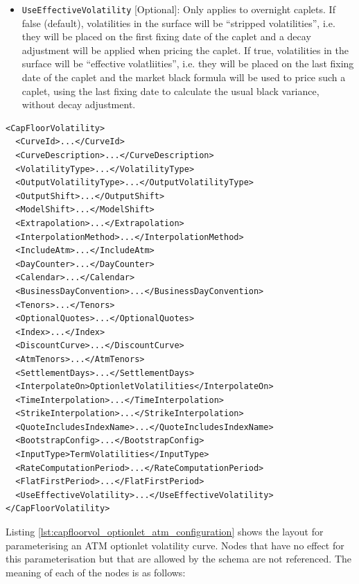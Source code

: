 \begin{itemize}
\item \lstinline!UseEffectiveVolatility! [Optional]:
Only applies to overnight caplets. If false (default), volatilities in the surface will be ``stripped volatilities'',
i.e. they will be placed on the first fixing date of the caplet and a decay adjustment will be applied when pricing the
caplet. If true, volatilities in the surface will be ``effective volatliities'', i.e. they will be placed on the last
fixing date of the caplet and the market black formula will be used to price such a caplet, using the last fixing date
to calculate the usual black variance, without decay adjustment.

\end{itemize}

\begin{longlisting}
\begin{verbatim}
<CapFloorVolatility>
  <CurveId>...</CurveId>
  <CurveDescription>...</CurveDescription>
  <VolatilityType>...</VolatilityType>
  <OutputVolatilityType>...</OutputVolatilityType>
  <OutputShift>...</OutputShift>
  <ModelShift>...</ModelShift>
  <Extrapolation>...</Extrapolation>
  <InterpolationMethod>...</InterpolationMethod>
  <IncludeAtm>...</IncludeAtm>
  <DayCounter>...</DayCounter>
  <Calendar>...</Calendar>
  <BusinessDayConvention>...</BusinessDayConvention>
  <Tenors>...</Tenors>
  <OptionalQuotes>...</OptionalQuotes>
  <Index>...</Index>
  <DiscountCurve>...</DiscountCurve>
  <AtmTenors>...</AtmTenors>
  <SettlementDays>...</SettlementDays>
  <InterpolateOn>OptionletVolatilities</InterpolateOn>
  <TimeInterpolation>...</TimeInterpolation>
  <StrikeInterpolation>...</StrikeInterpolation>
  <QuoteIncludesIndexName>...</QuoteIncludesIndexName>
  <BootstrapConfig>...</BootstrapConfig>
  <InputType>TermVolatilities</InputType>
  <RateComputationPeriod>...</RateComputationPeriod>
  <FlatFirstPeriod>...</FlatFirstPeriod>
  <UseEffectiveVolatility>...</UseEffectiveVolatility>
</CapFloorVolatility>
\end{verbatim}
\caption{Cap floor surface with interpolation on optionlet volatilities.}
\label{lst:capfloorvol_surface_configuration_opt}
\end{longlisting}


Listing \ref{lst:capfloorvol_optionlet_atm_configuration} shows the layout for parameterising an ATM optionlet volatility curve. Nodes that have no effect for this parameterisation but that are allowed by the schema are not referenced. The meaning of each of the nodes is as follows:

